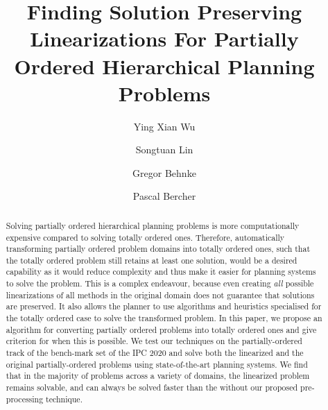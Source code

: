 \documentclass[runningheads]{llncs}
\begin{document}
\title{Finding Solution Preserving Linearizations For Partially Ordered Hierarchical Planning Problems}

\author{Ying Xian Wu \and
Songtuan Lin  \and
Gregor Behnke \and
Pascal Bercher }

%


%
\maketitle              %
%
\begin{abstract}
Solving partially ordered hierarchical planning problems is more computationally expensive compared to solving totally ordered ones. Therefore, automatically transforming partially ordered problem domains into totally ordered ones, such that the totally ordered problem still retains at least one solution, would be a desired capability as it would reduce complexity and thus make it easier for planning systems to solve the problem. This is a complex endeavour, because even creating \emph{all} possible linearizations of all methods in the original domain does not guarantee that solutions are preserved. 
It also allows the planner to use algorithms and heuristics specialised for the totally ordered case to solve the transformed problem. 
In this paper, we propose an algorithm for converting partially ordered problems into totally ordered ones and give criterion for when this is possible. We test our techniques on the partially-ordered track of the bench-mark set of the IPC 2020 and solve both the linearized and the original partially-ordered problems using state-of-the-art planning systems. We find that in the majority of problems across a variety of domains, the linearized problem remains solvable, and can always be solved faster than the without our proposed pre-processing technique.

\end{abstract}
 
\end{document}
